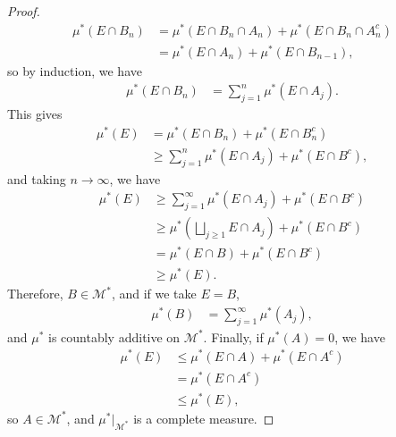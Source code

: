 \documentclass[10pt]{mypackage}
\begin{document}
\begin{proof}
  \begin{align*}
    \mu^{\ast}\left( E\cap B_n \right) &= \mu^{\ast}\left( E\cap B_n\cap A_n \right) + \mu^{\ast}\left( E\cap B_n\cap A_n^{c} \right)\\
                                       &= \mu^{\ast}\left( E\cap A_n \right) + \mu^{\ast}\left( E\cap B_{n-1} \right),
  \end{align*}
  so by induction, we have
  \begin{align*}
    \mu^{\ast}\left( E\cap B_n \right) &= \sum_{j=1}^{n} \mu^{\ast}\left( E\cap A_j \right).
  \end{align*}
  This gives
  \begin{align*}
    \mu^{\ast}\left( E \right) &= \mu^{\ast}\left( E\cap B_n \right) + \mu^{\ast}\left( E\cap B_n^{c} \right)\\
                               &\geq \sum_{j=1}^{n}\mu^{\ast}\left( E\cap A_j \right) + \mu^{\ast}\left( E\cap B^c \right),
  \end{align*}
  and taking $n\rightarrow\infty$, we have
  \begin{align*}
    \mu^{\ast}\left( E \right) &\geq \sum_{j=1}^{\infty} \mu^{\ast}\left( E\cap A_j \right) + \mu^{\ast}\left( E\cap B^c \right)\\
                               &\geq \mu^{\ast}\left( \bigsqcup_{j\geq 1}E\cap A_j \right) + \mu^{\ast}\left( E\cap B^c \right)\\
                               &= \mu^{\ast}\left( E\cap B \right) + \mu^{\ast}\left( E\cap B^{c} \right)\\
                               &\geq \mu^{\ast}\left( E \right).
  \end{align*}
  Therefore, $B\in \mathcal{M}^{\ast}$, and if we take $E = B$,
  \begin{align*}
    \mu^{\ast}\left( B \right) &= \sum_{j=1}^{\infty}\mu^{\ast}\left( A_j \right),
  \end{align*}
  and $\mu^{\ast}$ is countably additive on $\mathcal{M}^{\ast}$. Finally, if $\mu^{\ast}\left( A \right) = 0$, we have
  \begin{align*}
    \mu^{\ast}\left( E \right) &\leq \mu^{\ast}\left( E\cap A \right) + \mu^{\ast}\left( E\cap A^{c} \right)\\
                               &= \mu^{\ast}\left( E\cap A^{c} \right)\\
                               &\leq \mu^{\ast}\left( E \right),
  \end{align*}
  so $A\in \mathcal{M}^{\ast}$, and $\mu^{\ast}|_{\mathcal{M}^{\ast}}$ is a complete measure.\newline


\end{proof}
\end{document}

